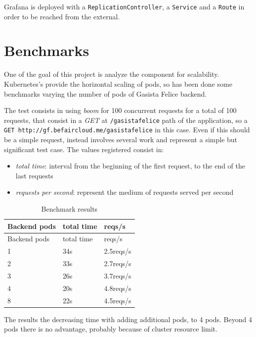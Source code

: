 Grafana is deployed with a \texttt{ReplicationController}, a
\texttt{Service} and a \texttt{Route} in order to be reached from the
external.

\section{Benchmarks}\label{benchmarks}

One of the goal of this project is analyze the component for
scalability. Kubernetes's provide the horizontal scaling of pods, so has
been done some benchmarks varying the number of pods of Gasista Felice
backend.

The test consists in using \emph{boom} for 100 concurrent requests for a
total of 100 requests, that consist in a \emph{GET} at
\texttt{/gasistafelice} path of the application, so a
\texttt{GET\ http://gf.befaircloud.me/gasistafelice} in this case. Even
if this should be a simple request, instead involves several work and
represent a simple but significant test case. The values registered
consist in:

\begin{itemize}
\itemsep1pt\parskip0pt
\item
  \emph{total time}: interval from the beginning of the first request,
  to the end of the last requests
\item
  \emph{requests per second}: represent the medium of requests served
  per second
\end{itemize}

\begin{longtable}[c]{@{}lll@{}}
\caption{Benchmark results}\tabularnewline
\toprule
Backend pods & total time & reqs/s\tabularnewline
\midrule
\endfirsthead
\toprule
Backend pods & total time & reqs/s\tabularnewline
\midrule
\endhead
1 & 34s & 2.5reqs/s\tabularnewline
2 & 33s & 2.7reqs/s\tabularnewline
3 & 26s & 3.7reqs/s\tabularnewline
4 & 20s & 4.8reqs/s\tabularnewline
8 & 22s & 4.5reqs/s\tabularnewline
\bottomrule
\end{longtable}

The results the decreasing time with adding additional pods, to 4 pods.
Beyond 4 pods there is no advantage, probably because of cluster
resource limit.